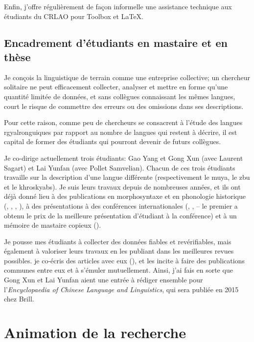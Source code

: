 \documentclass[oldfontcommands,oneside,a4paper,11pt]{article}
\begin{document}
Enfin, j'offre régulièrement de façon informelle une assistance technique aux étudiants du CRLAO pour Toolbox et \LaTeX{}.

\subsection{Encadrement d'étudiants en mastaire et en thèse} \label{sec:theses}
Je conçois la linguistique de terrain comme une entreprise collective; un chercheur solitaire ne peut efficacement collecter, analyser et mettre en forme qu'une quantité limitée de données, et sans collègues connaissant les mêmes langues, court le risque de commettre des erreurs ou des omissions dans ses descriptions.

Pour cette raison, comme peu de chercheurs se consacrent à l'étude des langues rgyalronguiques par rapport au nombre de langues qui restent à décrire, il est capital de former des étudiants qui pourront devenir de futurs collègues. 

Je co-dirige actuellement trois étudiants: Gao Yang et Gong Xun (avec Laurent Sagart) et Lai Yunfan (avec Pollet Samvelian). Chacun de ces trois étudiants travaille sur la description d'une langue différente (respectivement le muya, le zbu et le khroskyabs). Je suis leurs travaux depuis de nombreuses années, et ils ont déjà donné lieu à des publications en morphosyntaxe et en phonologie historique  (\citealt{gongxun14agreement}, \citealt{lai13fuyin}, \citealt{lai14person}, \citealt{jacques14rtau}), à des présentations à des conférences internationales (\citealt{gong14prosodic.tibetan}, \citealt{gong14prenasalized}, \citealt{lai14caus} -- le premier a obtenu le prix de la meilleure présentation d'étudiant à la conférence) et à un mémoire de mastaire copieux  (\citealt{lai13affixale}).

Je pousse mes étudiants à collecter des données fiables et revérifiables, mais également à valoriser leurs travaux en les publiant dans les meilleures revues possibles. je co-écris des articles avec eux (\citealt{jacques14rtau}), et les incite à faire des publications communes entre eux et à s'émuler mutuellement. Ainsi, j'ai fais en sorte que Gong Xun et Lai Yunfan aient une entrée à rédiger ensemble pour l'\textit{Encyclopaedia of Chinese Language and Linguistics}, qui sera publiée en 2015 chez Brill.



\section{Animation de la recherche} \label{sec:animation}
\end{document}
